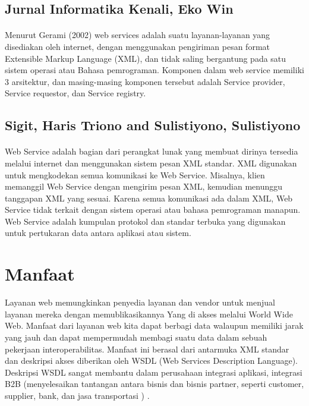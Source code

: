 \documentclass[12pt]{article}
\begin{document}
\subsection{Jurnal Informatika Kenali, Eko Win }
\paragraph{}
Menurut Gerami (2002) web services adalah suatu layanan-layanan yang disediakan oleh internet, dengan menggunakan pengiriman pesan format Extensible Markup Language (XML), dan tidak saling bergantung pada satu sistem operasi atau Bahasa pemrograman. Komponen dalam web service memiliki 3 arsitektur, dan masing-masing komponen tersebut adalah Service provider, Service requestor, dan Service registry\cite{kenali2015desain}. 

\subsection{Sigit, Haris Triono and Sulistiyono, Sulistiyono}
\paragraph{}
Web Service adalah bagian dari perangkat lunak yang membuat dirinya tersedia melalui internet dan menggunakan sistem pesan XML standar. XML digunakan untuk mengkodekan semua komunikasi ke Web Service. Misalnya, klien memanggil Web Service dengan mengirim pesan XML, kemudian menunggu tanggapan XML yang sesuai. Karena semua komunikasi ada dalam XML, Web Service tidak terkait dengan sistem operasi atau bahasa pemrograman manapun. Web Service adalah kumpulan protokol dan standar terbuka yang digunakan untuk pertukaran data antara aplikasi atau sistem\cite{sigit2017desain}.  

\section{Manfaat}

Layanan web memungkinkan penyedia layanan dan vendor untuk menjual layanan mereka dengan memublikasikannya
Yang di akses melalui World Wide Web.
Manfaat dari layanan web kita dapat berbagi data walaupun memiliki jarak yang jauh dan dapat mempermudah membagi suatu data dalam sebuah pekerjaan
interoperabilitas. Manfaat ini berasal dari antarmuka XML standar dan deskripsi akses
diberikan oleh WSDL (Web Services Description Language). Deskripsi WSDL sangat membantu dalam perusahaan
integrasi aplikasi, integrasi B2B (menyelesaikan tantangan antara bisnis dan bisnis partner, seperti customer, supplier, bank, dan jasa transportasi ) \cite{ferris2003web}.
\end{document}

